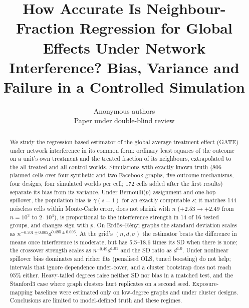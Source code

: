 \documentclass{article}
\title{How Accurate Is Neighbour-Fraction Regression for Global Effects Under Network Interference? Bias, Variance and Failure in a Controlled Simulation}
\author{Anonymous authors\\Paper under double-blind review}
\begin{document}
\maketitle
\begin{abstract}
We study the regression-based estimator of the global average treatment effect (GATE) under network interference in its common form: ordinary least squares of the outcome on a unit's own treatment and the treated fraction of its neighbours, extrapolated to the all-treated and all-control worlds.
Simulations with exactly known truth (806 planned cells over four synthetic and two Facebook graphs, five outcome mechanisms, four designs, four simulated worlds per cell; 172 cells added after the first results) separate its bias from its variance.
Under Bernoulli($p$) assignment and one-hop spillover, the population bias is $\gamma(s-1)$ for an exactly computable $s$; it matches 144 noiseless cells within Monte-Carlo error, does not shrink with $n$ ($+2.53\to+2.49$ from $n=10^3$ to $2\cdot10^4$), is proportional to the interference strength in 14 of 16 tested groups, and changes sign with $p$.
On Erd\H{o}s--R\'enyi graphs the standard deviation scales as $n^{-0.501\pm0.005}d^{0.495\pm0.006}$.
At the grid's $(n,d,\sigma)$ the estimator beats the difference in means once interference is moderate, but has 5.5--18.6 times its SD when there is none; the crossover strength scales as $n^{-0.49}d^{1.01}$ and the SD ratio as $d^{1.0}$.
Under nonlinear spillover bias dominates and richer fits (penalised OLS, tuned boosting) do not help; intervals that ignore dependence under-cover, and a cluster bootstrap does not reach 95\% either.
Heavy-tailed degrees raise neither SD nor bias in a matched test, and the Stanford3 case where graph clusters hurt replicates on a second seed.
Exposure-mapping baselines were estimated only on low-degree graphs and under cluster designs. Conclusions are limited to model-defined truth and these regimes.
\end{abstract}









\end{document}
